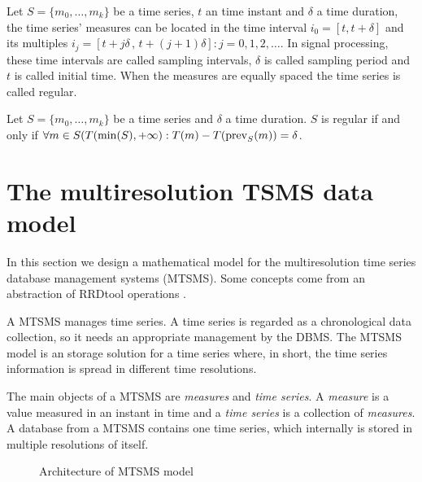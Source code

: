 
Let $S=\{m_0,\ldots,m_k\}$ be a time series, $t$ an time instant and
$\delta$ a time duration, the time series' measures can be located in
the time interval $i_0=[t,t+\delta]$ and its multiples $i_j=[t+j\delta
\,,\, t+(j+1)\delta]: j=0,1,2,\ldots$. In signal processing, these
time intervals are called sampling intervals, $\delta$ is called
sampling period and $t$ is called initial time. When the measures are
equally spaced the time series is called regular.

\begin{definition}
  Let $S=\{m_0,\ldots,m_k\}$ be a time series and $\delta$ a time
  duration. $S$ is regular if and only if $\forall m \in
  S(T(\min(S),+\infty):T(m) - T(\operatorname*{prev}_S(m)) =
  \delta$. %
\end{definition}



\section{The multiresolution TSMS data model}
\label{sec:MTSMS}

In this section we design a mathematical model for the multiresolution
time series database management systems (MTSMS). Some concepts come
from an abstraction of RRDtool operations \cite{rrdtool}.

A MTSMS manages time series. A time series is regarded as a
chronological data collection, so it needs an appropriate management
by the DBMS.  The MTSMS model is an storage solution for a time series
where, in short, the time series information is spread in different
time resolutions.

The main objects of a MTSMS are \emph{measures} and \emph{time
  series}. A \emph{measure} is a value measured in an instant in time
and a \emph{time series} is a collection of \emph{measures}. A
database from a MTSMS contains one time series, which internally is
stored in multiple resolutions of itself.

\begin{figure}[tp]
\centering
\setlength{\unitlength}{0.3mm}

\caption{Architecture of MTSMS model}
\label{fig:model:mtsdb}
\end{figure}

